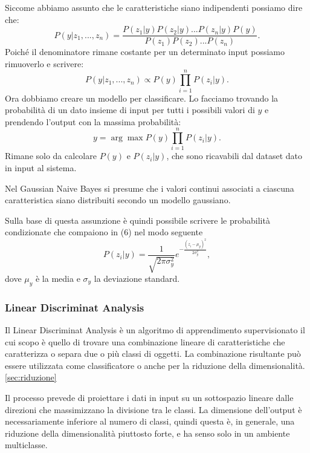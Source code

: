 \documentclass[12pt,italian]{report}
\begin{document}
Siccome abbiamo assunto che le caratteristiche siano indipendenti possiamo dire che:
\begin{equation}
P(y| z_1,..., z_n) = \frac{P(z_1|y) P(z_2|y)...P(z_n|y)P(y)}{P(z_1)P(z_2)...P(z_n)}.
\end{equation}
Poiché il denominatore rimane costante per un determinato input possiamo rimuoverlo e scrivere:
\begin{equation}
P(y| z_1,..., z_n) \propto P(y) \prod_{i=1}^{n} P(z_i|y).
\end{equation}
Ora dobbiamo creare un modello per classificare. Lo facciamo trovando la probabilità di un dato insieme di input per tutti i possibili valori di $y$ e prendendo l'output con la massima probabilità:
\begin{equation}
y = \arg\max P(y) \prod_{i=1}^{n} P(z_i|y).
\end{equation}
Rimane solo da calcolare $P(y)$ e $P(z_i|y)$, che sono ricavabili dal dataset dato in input al sistema.

Nel Gaussian Naive Bayes si presume che i valori continui associati a ciascuna caratteristica siano distribuiti secondo un modello gaussiano. 

Sulla base di questa assunzione è quindi possibile scrivere le probabilità condizionate che compaiono in (6) nel modo seguente
\begin{equation}
P(z_i|y) = \frac{1}{\sqrt{2\pi \sigma_y^2}} e^{-\frac{(z_i-\mu_y)^2}{2\sigma_y^2}},
\end{equation}
dove $\mu_y$ è la media e $\sigma_y$ la deviazione standard.
\subsubsection{Linear Discriminat Analysis}
Il Linear Discriminat Analysis è un algoritmo di apprendimento supervisionato il cui scopo è quello di trovare una combinazione lineare di caratteristiche che caratterizza o separa due o più classi di oggetti. La combinazione risultante può essere utilizzata come classificatore o anche per la riduzione della dimensionalità. \ref{sec:riduzione}

Il processo prevede di proiettare i dati in input su un sottospazio lineare dalle direzioni che massimizzano la divisione tra le classi. La dimensione dell'output è necessariamente inferiore al numero di classi, quindi questa è, in generale, una riduzione della dimensionalità piuttosto forte, e ha senso solo in un ambiente multiclasse.
\end{document}
